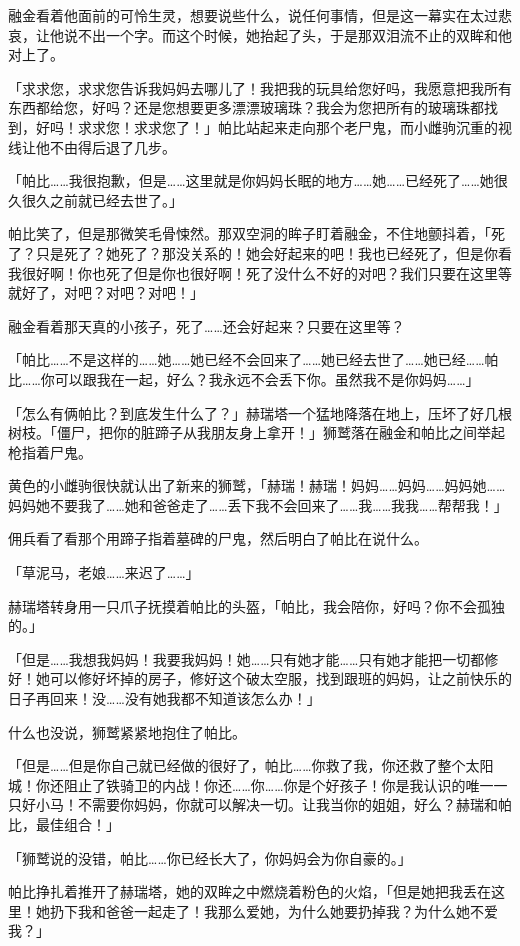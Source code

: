融金看着他面前的可怜生灵，想要说些什么，说任何事情，但是这一幕实在太过悲哀，让他说不出一个字。而这个时候，她抬起了头，于是那双泪流不止的双眸和他对上了。

「求求您，求求您告诉我妈妈去哪儿了！我把我的玩具给您好吗，我愿意把我所有东西都给您，好吗？还是您想要更多漂漂玻璃珠？我会为您把所有的玻璃珠都找到，好吗！求求您！求求您了！」帕比站起来走向那个老尸鬼，而小雌驹沉重的视线让他不由得后退了几步。

「帕比……我很抱歉，但是……这里就是你妈妈长眠的地方……她……已经死了……她很久很久之前就已经去世了。」

帕比笑了，但是那微笑毛骨悚然。那双空洞的眸子盯着融金，不住地颤抖着，「死了？只是死了？她死了？那没关系的！她会好起来的吧！我也已经死了，但是你看我很好啊！你也死了但是你也很好啊！死了没什么不好的对吧？我们只要在这里等就好了，对吧？对吧？对吧！」

融金看着那天真的小孩子，死了……还会好起来？只要在这里等？

「帕比……不是这样的……她……她已经不会回来了……她已经去世了……她已经……帕比……你可以跟我在一起，好么？我永远不会丢下你。虽然我不是你妈妈……」

「怎么有俩帕比？到底发生什么了？」赫瑞塔一个猛地降落在地上，压坏了好几根树枝。「僵尸，把你的脏蹄子从我朋友身上拿开！」狮鹫落在融金和帕比之间举起枪指着尸鬼。

黄色的小雌驹很快就认出了新来的狮鹫，「赫瑞！赫瑞！妈妈……妈妈……妈妈她……妈妈她不要我了……她和爸爸走了……丢下我不会回来了……我……我我……帮帮我！」

佣兵看了看那个用蹄子指着墓碑的尸鬼，然后明白了帕比在说什么。

「草泥马，老娘……来迟了……」

赫瑞塔转身用一只爪子抚摸着帕比的头盔，「帕比，我会陪你，好吗？你不会孤独的。」

「但是……我想我妈妈！我要我妈妈！她……只有她才能……只有她才能把一切都修好！她可以修好坏掉的房子，修好这个破太空服，找到跟班的妈妈，让之前快乐的日子再回来！没……没有她我都不知道该怎么办！」

什么也没说，狮鹫紧紧地抱住了帕比。

「但是……但是你自己就已经做的很好了，帕比……你救了我，你还救了整个太阳城！你还阻止了铁骑卫的内战！你还……你……你是个好孩子！你是我认识的唯一一只好小马！不需要你妈妈，你就可以解决一切。让我当你的姐姐，好么？赫瑞和帕比，最佳组合！」

「狮鹫说的没错，帕比……你已经长大了，你妈妈会为你自豪的。」

帕比挣扎着推开了赫瑞塔，她的双眸之中燃烧着粉色的火焰，「但是她把我丢在这里！她扔下我和爸爸一起走了！我那么爱她，为什么她要扔掉我？为什么她不爱我？」

